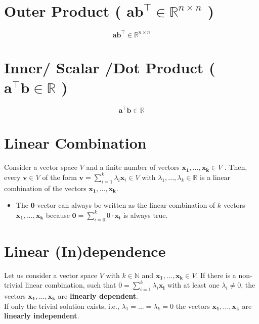 \section{Outer Product ( $\mathbf{ab^\top} \in \mathbb{R}^{n\times n}$ ) \cite{mfml-1}} \label{vector: Outer Product}
\[
    \mathbf{ab^\top} \in \mathbb{R}^{n\times n}
\]

\section{Inner/ Scalar /Dot Product ( $\mathbf{a^\top b} \in \mathbb{R}$ ) \cite{mfml-1}} \label{vector: Inner/ Scalar /Dot Product}
\[
    \mathbf{a^\top b} \in \mathbb{R}
\]


\section{Linear Combination \cite{mfml-1}}\label{Linear Combination}
Consider a vector space $V$ and a finite number of vectors $\mathbf{x_1, ... , x_k} \in V$ . Then, every $\mathbf{v} \in V$ of the form
\(
    \mathbf{v} = \displaystyle\sum_{i=1}^{k} \lambda_i \mathbf{x}_i \in V
\) 
with $\lambda_1, ..., \lambda_k \in \mathbb{R}$ is a linear combination of the vectors $\mathbf{x_1, ..., x_k}$.

\begin{itemize}
    \item The $\mathbf{0}$-vector can always be written as the linear combination of $k$ vectors $\mathbf{x_1, ..., x_k}$ because $\displaystyle\mathbf{0} = \sum_{i=0}^{k} 0\cdot\mathbf{x_i}$ is always true.
\end{itemize}

\section{Linear (In)dependence \cite{mfml-1}}\label{Linear (In)dependence}

Let us consider a vector space $V$ with $k \in \mathbb{N}$ and $\mathbf{x_1, ..., x_k} \in V$. If there is a non-trivial linear combination, such that $0 = \displaystyle\sum^k_{i=1} \lambda_i\mathbf{x_i}$ with at least one $\lambda_i \neq 0$, the vectors $\mathbf{x_1, ..., x_k}$ are \textbf{linearly dependent}. \\If only the trivial solution exists, i.e., $\lambda_1 = ... = \lambda_k = 0$ the vectors $\mathbf{x_1, ..., x_k}$ are \textbf{linearly independent}.

